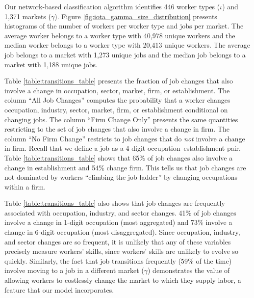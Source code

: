 \documentclass[12pt]{article}
\def\g{\gamma}
\def\i{\iota}
\theoremstyle{definition}
\theoremstyle{plain}
\begin{document}
Our network-based classification algorithm identifies 446 worker types ($\i$) and 1,371 markets ($\g$). Figure \ref{fig:iota_gamma_size_distribution} presents histograms of the number of workers per worker type and jobs per market. The average worker belongs to a worker type with 40,978 unique workers and the median worker belongs to a worker type with 20,413 unique workers. The average job belongs to a market with 1,273 unique jobs and the median job belongs to a market with 1,188 unique jobs. 

Table \ref{table:transitions_table} presents the fraction of job changes that also involve a change in occupation, sector, market, firm, or establishment. The column ``All Job Changes'' computes the probability that a worker changes occupation, industry, sector, market, firm, or establishment conditional on changing jobs. The column ``Firm Change Only'' presents the same quantities restricting to the set of job changes that also involve a change in firm. The column ``No Firm Change'' restricts to job changes that do \emph{not} involve a change in firm. Recall that we define a job as a 4-digit occupation--establishment pair. Table \ref{table:transitions_table} shows that 65\% of job changes also involve a change in establishment and 54\% change firm. This tells us that job changes are not dominated by workers ``climbing the job ladder'' by changing occupations within a firm. 

Table \ref{table:transitions_table} also shows that job changes are frequently associated with occupation, industry, and sector changes. 41\% of job changes involve a change in 1-digit occupation (most aggregated) and 73\% involve a change in 6-digit occupation (most disaggregated). Since occupation, industry, and sector changes are so frequent, it is unlikely that any of these variables precisely measure workers' skills, since workers' skills are unlikely to evolve so quickly. Similarly, the fact that job transitions frequently (59\% of the time) involve moving to a job in a different market ($\g$) demonstrates the value of allowing workers to costlessly change the market to which they supply labor, a feature that our model incorporates. 
\end{document}

